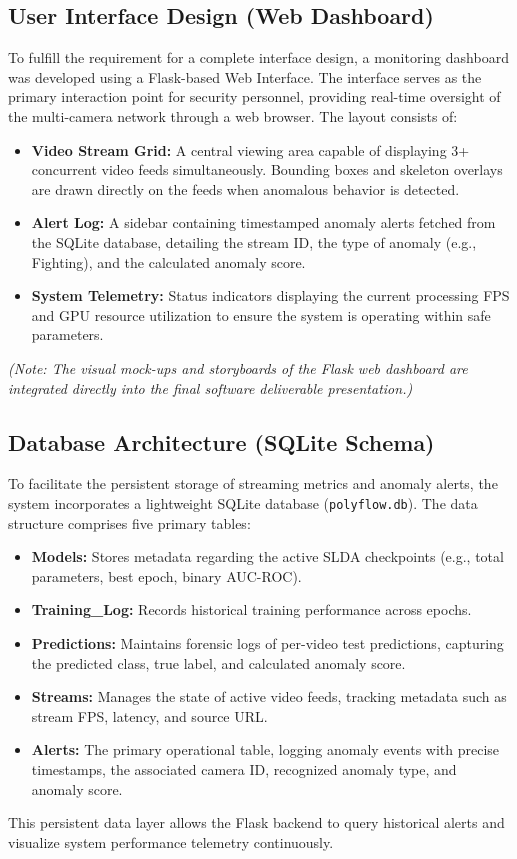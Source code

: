 \documentclass[12pt]{article}
\begin{document}
\clearpage
\subsection{User Interface Design (Web Dashboard)}
To fulfill the requirement for a complete interface design, a monitoring dashboard was developed using a Flask-based Web Interface. The interface serves as the primary interaction point for security personnel, providing real-time oversight of the multi-camera network through a web browser. The layout consists of:
\begin{itemize}
    \item \textbf{Video Stream Grid:} A central viewing area capable of displaying 3+ concurrent video feeds simultaneously. Bounding boxes and skeleton overlays are drawn directly on the feeds when anomalous behavior is detected.
    \item \textbf{Alert Log:} A sidebar containing timestamped anomaly alerts fetched from the SQLite database, detailing the stream ID, the type of anomaly (e.g., Fighting), and the calculated anomaly score.
    \item \textbf{System Telemetry:} Status indicators displaying the current processing FPS and GPU resource utilization to ensure the system is operating within safe parameters.
\end{itemize}
\textit{(Note: The visual mock-ups and storyboards of the Flask web dashboard are integrated directly into the final software deliverable presentation.)}

\subsection{Database Architecture (SQLite Schema)}
To facilitate the persistent storage of streaming metrics and anomaly alerts, the system incorporates a lightweight SQLite database (\texttt{polyflow.db}). The data structure comprises five primary tables:
\begin{itemize}
    \item \textbf{Models:} Stores metadata regarding the active SLDA checkpoints (e.g., total parameters, best epoch, binary AUC-ROC).
    \item \textbf{Training\_Log:} Records historical training performance across epochs.
    \item \textbf{Predictions:} Maintains forensic logs of per-video test predictions, capturing the predicted class, true label, and calculated anomaly score.
    \item \textbf{Streams:} Manages the state of active video feeds, tracking metadata such as stream FPS, latency, and source URL.
    \item \textbf{Alerts:} The primary operational table, logging anomaly events with precise timestamps, the associated camera ID, recognized anomaly type, and anomaly score.
\end{itemize}
This persistent data layer allows the Flask backend to query historical alerts and visualize system performance telemetry continuously.
\end{document}
